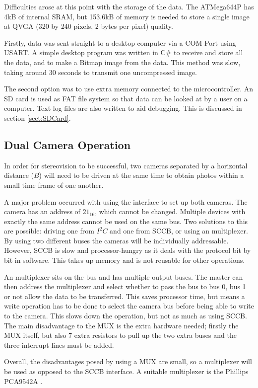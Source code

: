 Difficulties arose at this point with the storage of the data. The ATMega644P has 4kB of internal SRAM, but  153.6kB of memory is needed to store a single image at QVGA (320 by 240 pixels, 2 bytes per pixel) quality. 

Firstly, data was sent straight to a desktop computer via a COM Port using USART. A simple desktop program was written in C\# to receive and store all the data, and to make a Bitmap image from the data. This method was slow, taking around 30 seconds to transmit one uncompressed image. 

The second option was to use extra memory connected to the microcontroller. An SD card is used as FAT file system so that data can be looked at by a user on a computer. Text log files are also written to aid debugging. This is discussed in section \ref{sect:SDCard}. 

\subsection{Dual Camera Operation}
In order for stereovision to be successful, two cameras separated by a horizontal distance ($B$) will need to be driven at the same time to obtain photos within a small time frame of one another.

A major problem occurred with using the \itc interface to set up both cameras. The camera has an \itc address of $21_{16}$, which cannot be changed. Multiple \itc devices with exactly the same address cannot be used on the same bus. 
Two solutions to this are possible: driving one from $I^{2}C$ and one from SCCB, or using an \itc multiplexer. By using two different buses the cameras will be individually addressable. However, SCCB is slow and processor-hungry as it deals with the protocol bit by bit in software. This takes up memory and is not reusable for other operations.

An \itc multiplexer sits on the bus and has multiple output buses. The master can then address the multiplexer and select whether to pass the bus to bus 0, bus 1 or not allow the data to be transferred. This saves processor time, but means a write operation has to be done to select the camera bus before being able to write to the camera. This slows down the operation, but not as much as using SCCB. The main disadvantage to the \itc MUX is the extra hardware needed; firstly the MUX itself, but also 7 extra resistors to pull up the two extra buses and the three interrupt lines must be added. 

Overall, the disadvantages posed by using a MUX are small, so a multiplexer will be used as opposed to the SCCB interface. A suitable multiplexer is the Phillips PCA9542A \citep{I2C_Mux}.

